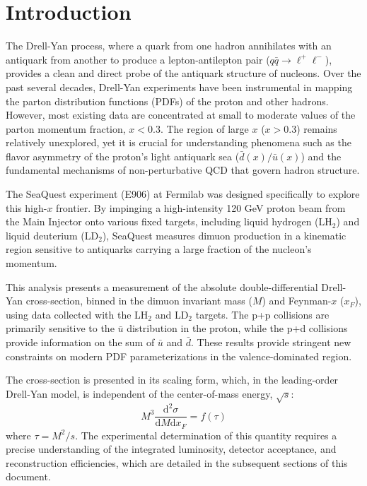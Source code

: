 \documentclass[11pt]{article}
\newcommand{\diffd}{\mathrm{d}}
\begin{document}
\section{Introduction}
\label{sec:introduction}
The Drell-Yan process, where a quark from one hadron annihilates with an antiquark from another to produce a lepton-antilepton pair ($q\bar{q} \rightarrow \ell^+\ell^-$), provides a clean and direct probe of the antiquark structure of nucleons. Over the past several decades, Drell-Yan experiments have been instrumental in mapping the parton distribution functions (PDFs) of the proton and other hadrons. However, most existing data are concentrated at small to moderate values of the parton momentum fraction, $x < 0.3$. The region of large $x$ ($x>0.3$) remains relatively unexplored, yet it is crucial for understanding phenomena such as the flavor asymmetry of the proton's light antiquark sea ($\bar{d}(x)/\bar{u}(x)$) and the fundamental mechanisms of non-perturbative QCD that govern hadron structure.

The SeaQuest experiment (E906) at Fermilab was designed specifically to explore this high-$x$ frontier. By impinging a high-intensity 120 GeV proton beam from the Main Injector onto various fixed targets, including liquid hydrogen (LH$_2$) and liquid deuterium (LD$_2$), SeaQuest measures dimuon production in a kinematic region sensitive to antiquarks carrying a large fraction of the nucleon's momentum.

This analysis presents a measurement of the absolute double-differential Drell-Yan cross-section, binned in the dimuon invariant mass ($M$) and Feynman-$x$ ($x_F$), using data collected with the LH$_2$ and LD$_2$ targets. The p+p collisions are primarily sensitive to the $\bar{u}$ distribution in the proton, while the p+d collisions provide information on the sum of $\bar{u}$ and $\bar{d}$. These results provide stringent new constraints on modern PDF parameterizations in the valence-dominated region.

The cross-section is presented in its scaling form, which, in the leading-order Drell-Yan model, is independent of the center-of-mass energy, $\sqrt{s}$:
\begin{equation}
    M^{3}\frac{\diffd^{2}\sigma}{\diffd M \diffd x_{F}} = f(\tau)
\end{equation}
where $\tau = M^2/s$. The experimental determination of this quantity requires a precise understanding of the integrated luminosity, detector acceptance, and reconstruction efficiencies, which are detailed in the subsequent sections of this document.
\end{document}
